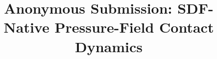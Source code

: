 \documentclass[11pt,a4paper]{ctexart}
\title{Anonymous Submission: SDF-Native Pressure-Field Contact Dynamics}
\author{}
\date{}
\begin{document}
\maketitle











\appendix
\FloatBarrier


%
%
\end{document}
